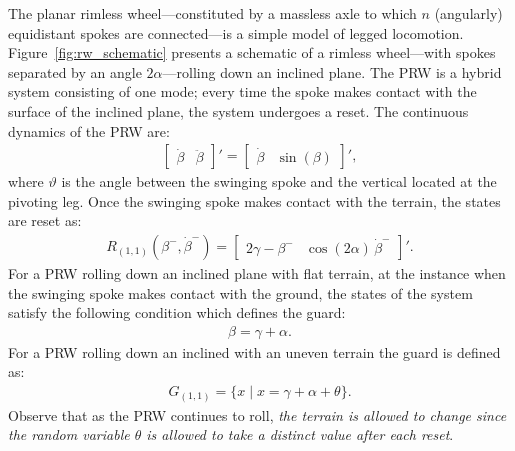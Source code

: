\begin{example}
\label{example:rw}
The planar rimless wheel---constituted by a massless axle to which $n$ (angularly) equidistant spokes are connected---is a simple model of legged locomotion.
Figure~\ref{fig:rw_schematic} presents a schematic of a rimless wheel---with spokes separated by an angle $2\alpha$---rolling down an inclined plane.
The PRW is a hybrid system consisting of one mode; every time the spoke makes contact with the surface of the inclined plane, the system undergoes a reset.
The continuous dynamics of the PRW are:
\begin{align}
  \begin{bmatrix}
    \dot \beta& \ddot\beta
  \end{bmatrix}'=\begin{bmatrix}
    \dot\beta&\sin(\beta)
  \end{bmatrix}',
\end{align}
where $\vartheta$ is the angle between the swinging spoke and the vertical located at the pivoting leg. Once the swinging spoke makes contact with the terrain, the states are reset as:
\begin{align}
R_{(1,1)}(\beta^-,\dot \beta^-)=\begin{bmatrix}
    2\gamma-\beta^-&
    \cos(2\alpha)\,\dot\beta^-
  \end{bmatrix}'.
\end{align}
For a PRW rolling down an inclined plane with flat terrain, at the instance when the swinging spoke makes contact with the ground, the states of the system satisfy the following condition which defines the guard:
\begin{align}
\beta = \gamma+\alpha.
\end{align}
For a PRW rolling down an inclined with an uneven terrain the guard is defined as:
\begin{align}
G_{(1,1)}=\{x\mid x=\gamma+\alpha+\theta\}.
\end{align}
Observe that as the PRW continues to roll, \emph{the terrain is allowed to change since the random variable $\theta$ is allowed to take a distinct value after each reset}.
\end{example}

